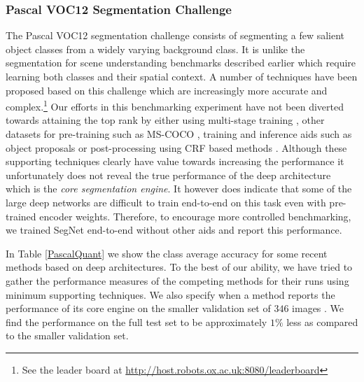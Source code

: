 \subsubsection{Pascal VOC12 Segmentation Challenge}
\label{Pascal}
The Pascal VOC12 segmentation challenge \citep{pascal} consists of segmenting a few salient object classes from a widely varying background class. It is unlike the segmentation for scene understanding benchmarks described earlier which require learning both classes and their spatial context. A number of techniques have been proposed based on this challenge which are increasingly more accurate and complex.\footnote{\label{pascallb} See the leader board at \url{http://host.robots.ox.ac.uk:8080/leaderboard}} Our efforts in this benchmarking experiment have not been diverted towards attaining the top rank by either using multi-stage training \citep{long2015fully}, other datasets for pre-training such as MS-COCO \citep{lin2014microsoft, CRFRNN}, training and inference aids such as object proposals \citep{zitnick2014edge, NohDeconvNets} or post-processing using CRF based methods \citep{chen2016deeplab, NohDeconvNets}.  Although these supporting techniques clearly have value towards increasing the performance it unfortunately does not reveal the true performance of the deep architecture which is the \textit{core segmentation engine}. It however does indicate that some of the large deep networks are difficult to train end-to-end on this task even with pre-trained encoder weights. Therefore, to encourage more controlled benchmarking, we trained SegNet end-to-end without other aids and report this performance. 

In Table \ref{PascalQuant} we show the class average accuracy for some recent methods based on deep architectures. To the best of our ability, we have tried to gather the performance measures of the competing methods for their runs using minimum supporting techniques. We also specify when a method reports the performance of its core engine on the smaller validation set of $346$ images \citep{chen2016deeplab}. We find the performance on the full test set to be approximately  $1\%$ less as compared to the smaller validation set. 


